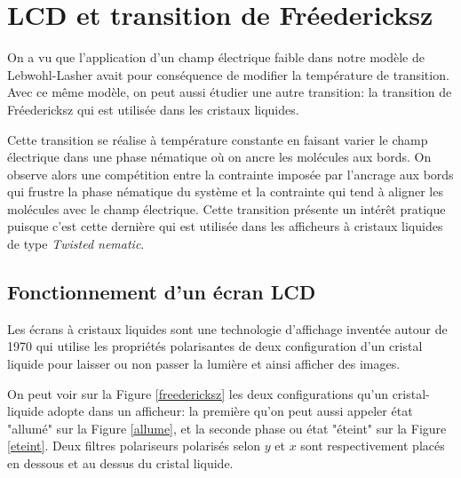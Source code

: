 \documentclass[11pt,a4paper]{article}
\numberwithin{equation}{section}
\begin{document}
\section{LCD et transition de Fréedericksz}




On a vu que l'application d'un champ électrique faible dans notre modèle de Lebwohl-Lasher avait pour conséquence de modifier la température de transition. Avec ce même modèle, on peut aussi étudier une autre transition: la transition de Fréedericksz qui est utilisée dans les cristaux liquides. 
\medskip

Cette transition se réalise à température constante en faisant varier le champ électrique dans une phase nématique où on ancre les molécules aux bords. On observe alors une compétition entre la contrainte imposée par l'ancrage aux bords qui frustre la phase nématique du système et la contrainte qui tend à aligner les molécules avec le champ électrique. Cette transition présente un intérêt pratique puisque c'est cette dernière qui est utilisée dans les afficheurs à cristaux liquides de type \textit{Twisted nematic}.

\subsection{Fonctionnement d'un écran LCD}

Les écrans à cristaux liquides sont une technologie d'affichage inventée autour de 1970 qui utilise les propriétés polarisantes de deux configuration d'un cristal liquide pour laisser ou non passer la lumière et ainsi afficher des images. 
\medskip

On peut voir sur la Figure \ref{freedericksz} les deux configurations qu'un cristal-liquide adopte dans un afficheur: la première qu'on peut aussi appeler état "allumé" sur la Figure \ref{allume}, et la seconde phase ou état "éteint" sur la Figure \ref{eteint}. Deux filtres polariseurs polarisés selon $y$ et $x$ sont respectivement placés en dessous et au dessus du cristal liquide.
\end{document}
